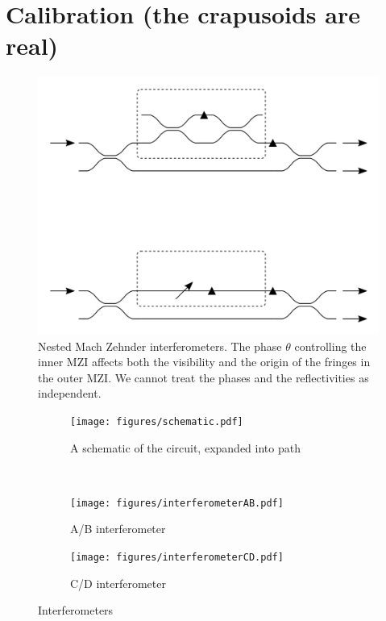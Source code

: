 \section{Calibration (the crapusoids are real)}
\label{sec:Calibration}
\begin{figure}[t]
  \centering
  \includegraphics{figures/crosstalk}
  \caption[Nested Mach Zehnder interferometers]
  {Nested Mach Zehnder interferometers. The phase \(\theta\) controlling the
  inner MZI affects both the visibility and the origin of the fringes in the
  outer MZI. We cannot treat the phases and the reflectivities as independent.}
  \label{fig:nestedMZI}
\end{figure}

\begin{figure}[t]
  \centering
  \begin{subfigure}{\textwidth}
    \texttt{[image: figures/schematic.pdf]}
    \caption{A schematic of the circuit, expanded into path}
    \label{fig:schematic}
  \end{subfigure} \\
  \vspace{1cm}
  \begin{subfigure}{0.45\textwidth}
    \texttt{[image: figures/interferometerAB.pdf]}
    \caption{A/B interferometer}
    \label{fig:ab}
  \end{subfigure}
  \hspace{0.05\textwidth}
  \begin{subfigure}{0.45\textwidth}
    \texttt{[image: figures/interferometerCD.pdf]}
    \caption{C/D interferometer}
    \label{fig:cd}
  \end{subfigure}
  \caption[Illustration of nested interferometers in the bulk Reck scheme]
  {Interferometers}
  \label{fig:interferometers}
\end{figure}

